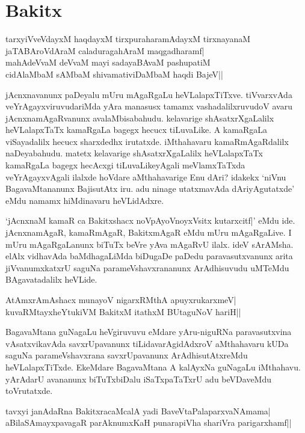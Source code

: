 \chapter{Bakitx}\label{chap2}

\begin{shloka}
tarxyiVveVdayxM haqdayxM tirxpuraharamAdayxM tirxnayanaM\\
jaTABAroVdAraM caladuragahAraM maqgadharamf|\\
mahAdeVvaM deVvaM mayi sadayaBAvaM pashupatiM\\
cidAlaMbaM sAMbaM shivamativiDaMbaM haqdi BajeV||
\end{shloka}

jAcnxnavanunx paDeyalu mUru mAgaRgaLu heVLalapxTiTxve. tiVvarxvAda veYrAgayxviruvudariMda yAra manasusx tamamx vashadalilxruvudoV 
avaru jAcnxnamAgaRvanunx avalaMbisabahudu. kelavarige shAsatxrXgaLalilx heVLalapxTaTx kamaRgaLa bagegx hecucx tiLuvaLike. A kamaRgaLa 
viSayadalilx hecucx sharxdedhx irutatxde. iMthahavaru kamaRmAgaRdalilx naDeyabahudu. matetx kelavarige shAsatxrXgaLalilx heVLalapxTaTx kamaRgaLa bagegx hecAcxgi 
tiLuvaLikeyAgali meVlamxTaTxda veYrAgayxvAgali ilalxde hoVdare aMthahavarige Enu dAri? idakekx `niVnu BagavaMtananunx BajisutAtx iru. adu ninage 
utatxmavAda dAriyAgutatxde' eMdu namamx hiMdinavaru heVLidAdxre.

`jAcnxnaM kamaR ca Bakitxshacx noVpAyoVnoyxV\s sitx kutarxcitf|' eMdu ide. jAcnxnamAgaR, kamaRmAgaR, BakitxmAgaR eMdu mUru 
mAgaRgaLive. I mUru mAgaRgaLanunx biTuTx beVre yAva mAgaRvU ilalx. ideV sArAMsha. elAlx vidhavAda baMdhagaLiMda biDugaDe paDedu 
paravasutxvanunx arita jiVvanumxkatxrU saguNa parameVshavxrananunx ArAdhisuvudu uMTeMdu BAgavatadalilx heVLide.

\begin{shloka}
AtAmxrAmAshacx munayoV nigarxRMthA apuyxrukarxmeV|\\
kuvaRMtayxheYtukiVM BakitxM itathxM BUtaguNoV hariH||
\end{shloka}

BagavaMtana guNagaLu heVgiruvuvu eMdare yAru-niguRNa paravasutxvina vAsatxvikavAda savxrUpavanunx tiLidavarAgidAdxroV aMthahavaru 
kUDa saguNa parameVshavxrana savxrUpavanunx ArAdhisutAtxreMdu heVLalapxTiTxde. EkeMdare BagavaMtana A kalAyxNa guNagaLu 
iMthahavu. yArAdarU avananunx biTuTxbiDalu iSaTxpaTaTxrU adu beVDaveMdu toVrutatxde.

\begin{shloka}
tavxyi janAdaRna BakitxracaMcalA yadi BaveVtaPalaparxvaNAmama|\\
aBilaSAmayxpavagaR parAknumxKaH punarapiVha shariVra parigarxhamf||
\end{shloka}

